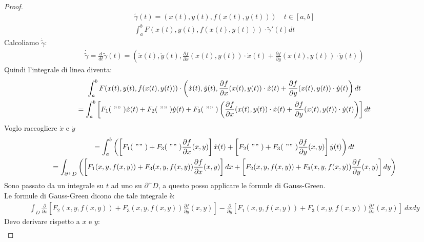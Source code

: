 \documentclass[a4paper, oneside]{article}
\begin{document}
\begin{proof}
\begin{gather*}
    \widetilde{\gamma}(t) = (x(t), y(t), f(x(t), y(t))) \quad t \in [a,b]\\
    \int_a^b F(x(t), y(t), f(x(t), y(t))) \cdot \widetilde{\gamma}'(t) dt
   \end{gather*}
   Calcoliamo $\dot{\widetilde{\gamma}}$:
   \begin{gather*}
    \dot{\widetilde{\gamma}} = \frac{d}{dt} \widetilde{\gamma} (t) = \left( \dot{x}(t), \dot{y}(t), \frac{\partial f}{\partial x} (x(t), y(t)) \cdot \dot{x}(t) + \frac{\partial f}{\partial y} (x(t), y(t)) \cdot \dot{y}(t) \right)
   \end{gather*}
   Quindi l'integrale di linea diventa:
   \begin{gather*}
    \int_a^b F(x(t), y(t), f(x(t), y(t))) \cdot \left( \dot{x}(t), \dot{y}(t), \frac{\partial f}{\partial x} (x(t), y(t)) \cdot \dot{x}(t) + \frac{\partial f}{\partial y} (x(t), y(t)) \cdot \dot{y}(t) \right) dt\\
    = \int_a^b \left[ F_1( \ "" \ ) \dot{x}(t) + F_2( \ "" \ ) \dot{y}(t) + F_3( \ "" \ ) \left( \frac{\partial f}{\partial x} (x(t), y(t)) \cdot \dot{x}(t) + \frac{\partial f}{\partial y} (x(t), y(t)) \cdot \dot{y}(t) \right) \right] dt\\
   \end{gather*}
   Voglo raccogliere $\dot{x}$ e $\dot{y}$
   \begin{gather*}
      = \int_a^b \left( \left[ F_1( \ "" \ ) + F_3( \ "" \ )\frac{\partial f}{\partial x}(x,y) \right] \dot{x}(t) + \left[ F_2( \ "" \ ) + F_3( \ "" \ )\frac{\partial f}{\partial y}(x,y) \right] \dot{y}(t) \right) dt\\
      = \int_{\partial^+ D} \left( \left[ F_1(x,y,f(x,y)) + F_3(x,y,f(x,y))\frac{\partial f}{\partial x}(x,y) \right] dx + \left[ F_2(x,y,f(x,y)) + F_3(x,y,f(x,y))\frac{\partial f}{\partial y}(x,y) \right] dy \right)
   \end{gather*}
   Sono passato da un integrale su $t$ ad uno su $\partial^+ D$, a questo posso applicare le formule di Gauss-Green.\\
   Le formule di Gauss-Green dicono che tale integrale è:
   \begin{gather*}
    \int_D \frac{\partial}{\partial x}\left[ F_2(x,y,f(x,y)) + F_3(x,y,f(x,y)) \frac{\partial f}{\partial y}(x,y) \right]- \frac{\partial}{\partial y} \left[ F_1(x,y,f(x,y)) + F_3(x,y,f(x,y))\frac{\partial f}{\partial x} (x,y) \right] \ dxdy  
   \end{gather*}
   Devo derivare rispetto a $x$ e $y$:
   \begin{gather*}

\end{gather*}
\end{proof}
\end{document}

